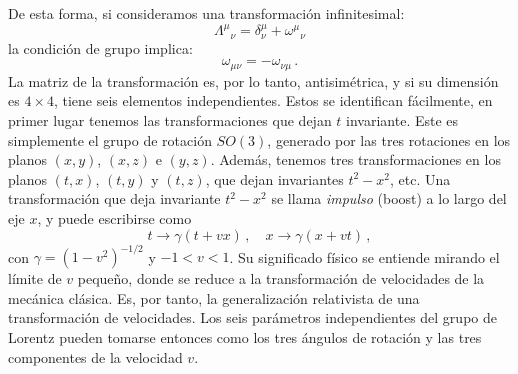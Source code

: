 \documentclass[a4paper,11pt]{book} %
\begin{document}
\noindent
De esta forma, si consideramos una transformación infinitesimal:
\begin{equation}
    \Lambda^\mu{}_\nu = \delta^\mu_\nu + \omega^\mu{}_\nu
\end{equation}
la condición de grupo implica:
\begin{equation}
    \omega_{\mu\nu} = -\omega_{\nu\mu}\,.
\end{equation}
La matriz de la transformación es, por lo tanto, antisimétrica, y si su dimensión es $4\times4$, tiene seis elementos independientes. Estos se identifican fácilmente, en primer lugar tenemos las transformaciones que dejan $t$ invariante. Este es simplemente el grupo de rotación $SO(3)$, generado por las tres rotaciones en los planos $(x,y)$, $(x,z)$ e $(y,z)$. Además, tenemos tres transformaciones en los planos $(t,x)$, $(t,y)$ y $(t,z)$, que dejan invariantes $t^2-x^2$, etc. Una transformación que deja invariante $t^2 - x^2$ se llama \textit{impulso} (boost) a lo largo del eje $x$, y puede escribirse como
\begin{equation}
    t \to \gamma(t + vx)\,,\quad x \to \gamma(x + vt)\,,
\end{equation}
con $\gamma = (1-v^2)^{-1/2}$ y $-1 < v < 1$. Su significado físico se entiende mirando el límite de $v$ pequeño, donde se reduce a la transformación de velocidades de la mecánica clásica. Es, por tanto, la generalización relativista de una transformación de velocidades. Los seis parámetros independientes del grupo de Lorentz pueden tomarse entonces como los tres ángulos de rotación y las tres componentes de la velocidad $v$.
 \newpage\noindent
\end{document}
